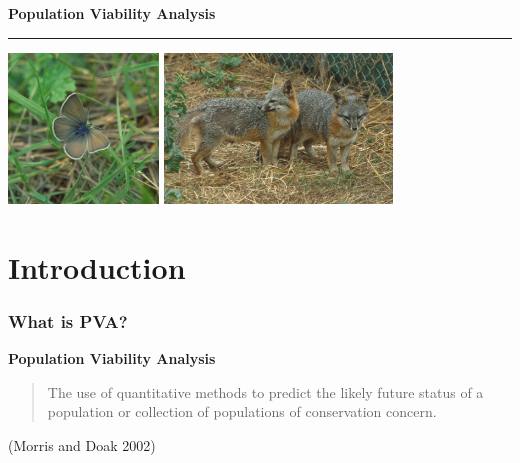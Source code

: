 \documentclass[color=usenames,dvipsnames]{beamer}\usepackage[]{graphicx}\usepackage[]{color}
\begin{document}

\begin{frame}[plain]
  \begin{center}
    {\huge \bf Population Viability Analysis \par}
    {\color{blue} \rule{\textwidth}{1pt}}
    \vfill
    \includegraphics[height=4cm,keepaspectratio]{figs/Fenders_blue} %
    \hspace{0.5cm}
    \includegraphics[height=4cm,keepaspectratio]{figs/Urocyon_littoralis}
  \end{center}
\end{frame}




\section{Introduction}





\begin{frame}
  \frametitle{What is PVA?}
  \Large
  {\bf Population Viability Analysis \\}
  \begin{quote}
    The use of quantitative methods to predict the likely future
    status of a population or collection of populations of
    conservation concern.
  \end{quote}
  \small
  \flushright (Morris and Doak 2002) \par
\end{frame}
\end{document}
